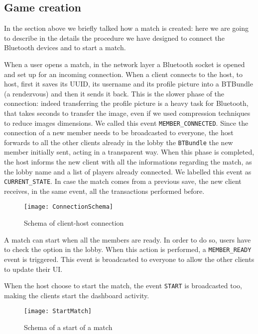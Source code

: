\subsection{Game creation}

In the section above we briefly talked how a match is created: here we are 
going to describe in the details the procedure we have designed to connect the 
Bluetooth devices and to start a match.

When a user opens a match, in the network layer a Bluetooth socket is opened 
and set up for an incoming connection. When a client connects to the host, to 
host, first it saves its UUID, its username and its profile picture into a 
BTBundle (a rendezvous) and then it sends it back.
This is the slower phase of the connection: indeed transferring the profile 
picture is a heavy task for Bluetooth, that takes seconds to transfer the image, 
even if we used compression techniques to reduce images dimensions. We called 
this event \texttt{MEMBER\_CONNECTED}. Since the connection of a new member 
needs to be broadcasted to everyone, the host forwards to all the other clients 
already in the lobby the \texttt{BTBundle} the new member initially sent, acting 
in a transparent way. When this phase is completed, the host informs the new 
client with all the informations regarding the match, as the lobby name and a 
list of players already connected. We labelled this event as 
\texttt{CURRENT\_STATE}. In case the match comes from a previous save, the new 
client receives, in the same event, all the transactions performed before.

\begin{figure}[t]
 \centering
 \texttt{[image: ConnectionSchema]}
 \caption{Schema of client-host connection}
 \label{fig:gbConnectionSchema}
\end{figure}

A match can start when all the members are ready. In order to do so, users have 
to check the option in the lobby. When this action is performed, a 
\texttt{MEMBER\_READY} event is triggered. This event is broadcasted to everyone 
to allow the other clients to update their UI.

When the host choose to start the match, the event \texttt{START} is 
broadcasted too, making the clients start the dashboard activity.

\begin{figure}[t]
 \centering
 \texttt{[image: StartMatch]}
 \caption{Schema of a start of a match}
 \label{fig:gbStartMatch}
\end{figure}

